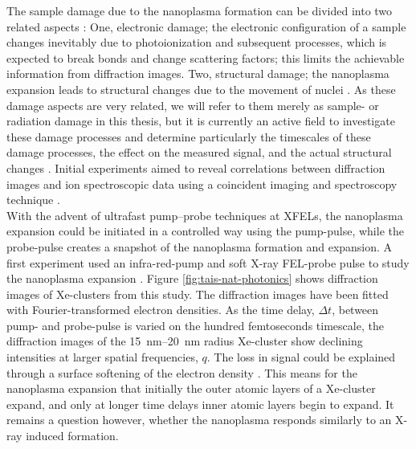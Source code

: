 The sample damage due to the nanoplasma formation can be divided into two related aspects \cite{Quiney-2010-NatPhys,Curwood-2013-PRA}: One, electronic damage; the electronic configuration of a sample changes inevitably due to photoionization and subsequent processes, which is expected to break bonds and change scattering factors; this limits the achievable information from diffraction images. Two, structural damage; the nanoplasma expansion leads to structural changes due to the movement of nuclei \citep{Neutze-2000-Nature}. As these damage aspects are very related, we will refer to them merely as sample- or radiation damage in this thesis, but it is currently an active field to investigate these damage processes and determine particularly the timescales of these damage processes, the effect on the measured signal, and the actual structural changes \citep{Bostedt-2012-PRL}. Initial experiments aimed to reveal correlations between diffraction images and ion spectroscopic data using a coincident imaging and spectroscopy technique \citep{Gorkhover-2012-PRL,Rupp-2016-PRL}.\\[1\baselineskip]
%
With the advent of ultrafast pump--probe techniques at XFELs, the nanoplasma expansion could be initiated in a controlled way using the pump-pulse, while the probe-pulse creates a snapshot of the nanoplasma formation and expansion. A first experiment used an infra-red-pump and soft X-ray FEL-probe pulse \citep{Schorb-2012-APL} to study the nanoplasma expansion \citep{Gorkhover-2016-NatPho}. Figure \ref{fig:tais-nat-photonics} shows diffraction images of Xe-clusters from this study. The diffraction images have been fitted with Fourier-transformed electron densities. As the time delay, $\Delta t$, between pump- and probe-pulse is varied on the hundred femtoseconds timescale, the diffraction images of the \SIrange{15}{20}{\nano\meter} radius Xe-cluster show declining intensities at larger spatial frequencies, $q$. The loss in signal could be explained through a surface softening of the electron density \citep{Hau-Riege-2008-PRE,Peltz-2014-PRL}. This means for the nanoplasma expansion that initially the outer atomic layers of a Xe-cluster expand, and only at longer time delays inner atomic layers begin to expand. It remains a question however, whether the nanoplasma responds similarly to an X-ray induced formation.\\[1\baselineskip]
